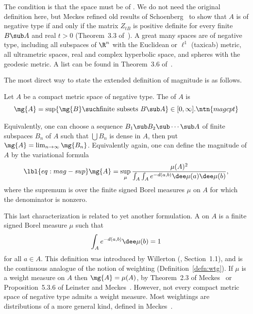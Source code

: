 The condition is that the space must be of .  We do not need the original definition here, but Meckes refined old
results of Schoenberg~\cite{SchoMSP} to show that $A$ is of negative type
if and only if the matrix $Z_{tB}$ is positive%
%
% 
definite for every finite $B \sub A$ and real
$t > 0$ (Theorem~3.3 of~\cite{MeckPDM}).  A great many spaces are of
negative type, including all subspaces of $\R^n$ with the Euclidean or
$\ell^1$ (taxicab) metric, all ultrametric spaces, real and complex
hyperbolic space, and spheres with the geodesic metric.  A list can be
found in Theorem~3.6 of~\cite{MeckPDM}.

The most direct way to state the extended definition of magnitude is as
follows.

\begin{defn}
Let $A$ be a compact metric space of negative type.  The %
% 
% 
of $A$ is
\[
\mg{A} 
= 
\sup \{ \mg{B} \such \text{finite subsets } B \sub A \}
\in 
[0, \infty].
\ntn{magcpt}
\]
\end{defn}

Equivalently, one can choose a sequence $B_1 \sub B_2 \sub \cdots \sub A$
of finite subspaces $B_n$ of $A$ such that $\bigcup B_n$ is dense in $A$,
then put $\mg{A} = \lim_{n \to \infty} \mg{B_n}$.  Equivalently again, one
can define the magnitude of $A$ by the variational formula
% 
\begin{equation}
\lbl{eq:mag-sup}
\mg{A}
=
\sup_\mu
\frac{\mu(A)^2}{\int_A \int_A e^{-d(a, b)} \dee\mu(a) \dee\mu(b)},
\end{equation}
% 
where the supremum is over the finite signed Borel measures $\mu$ on $A$
for which the denominator is nonzero.  

This last characterization is related to yet another formulation.  A
 on $A$ is a finite signed Borel measure $\mu$ such
that
\[
\int_A e^{-d(a, b)} \dee\mu(b) = 1
\]
for all $a \in A$.  This definition was introduced by Willerton%
%
% 
(\cite{WillMSS}, Section~1.1), and is the continuous analogue of the
notion of weighting (Definition~\ref{defn:wtg}).  If $\mu$ is a weight
measure on $A$ then $\mg{A} = \mu(A)$, by Theorem~2.3 of
Meckes~\cite{MeckPDM} or Proposition~5.3.6 of Leinster and
Meckes~\cite{MMSCG}.  However, not every compact metric space of negative
type admits a weight measure.  Most weightings are distributions of a more
general kind, defined in Meckes~\cite{MeckMDC}.%
%

